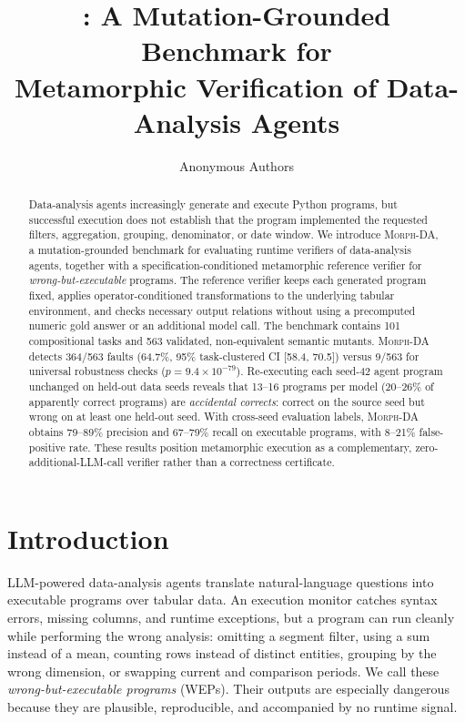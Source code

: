\documentclass{article}
\title{\morph: A Mutation-Grounded Benchmark for\\
Metamorphic Verification of Data-Analysis Agents}
\author{Anonymous Authors}
\newcommand{\morph}{\textsc{Morph-DA}\xspace}
\begin{document}
\normalsize
\maketitle

\begin{abstract}
Data-analysis agents increasingly generate and execute Python programs, but successful execution does not establish that the program implemented the requested filters, aggregation, grouping, denominator, or date window. We introduce \morph, a mutation-grounded benchmark for evaluating runtime verifiers of data-analysis agents, together with a specification-conditioned metamorphic reference verifier for \emph{wrong-but-executable} programs. The reference verifier keeps each generated program fixed, applies operator-conditioned transformations to the underlying tabular environment, and checks necessary output relations without using a precomputed numeric gold answer or an additional model call. The benchmark contains 101 compositional tasks and 563 validated, non-equivalent semantic mutants. \morph detects 364/563 faults (64.7\%, 95\% task-clustered CI [58.4, 70.5]) versus 9/563 for universal robustness checks ($p=9.4\times10^{-79}$). Re-executing each seed-42 agent program unchanged on held-out data seeds reveals that 13--16 programs per model (20--26\% of apparently correct programs) are \emph{accidental corrects}: correct on the source seed but wrong on at least one held-out seed. With cross-seed evaluation labels, \morph obtains 79--89\% precision and 67--79\% recall on executable programs, with 8--21\% false-positive rate. These results position metamorphic execution as a complementary, zero-additional-LLM-call verifier rather than a correctness certificate.
\end{abstract}

\section{Introduction}
\label{sec:intro}

LLM-powered data-analysis agents translate natural-language questions into executable programs over tabular data. An execution monitor catches syntax errors, missing columns, and runtime exceptions, but a program can run cleanly while performing the wrong analysis: omitting a segment filter, using a sum instead of a mean, counting rows instead of distinct entities, grouping by the wrong dimension, or swapping current and comparison periods. We call these \emph{wrong-but-executable programs} (WEPs). Their outputs are especially dangerous because they are plausible, reproducible, and accompanied by no runtime signal.
\end{document}
